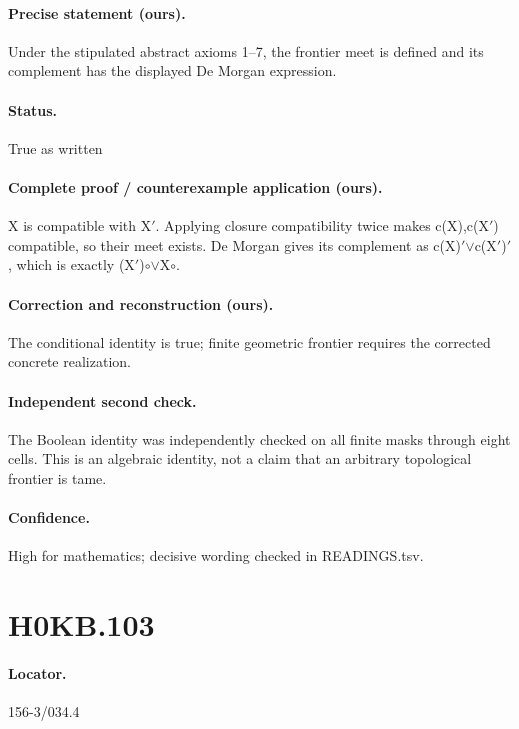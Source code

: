 \paragraph{Precise statement (ours).} Under the stipulated abstract axioms 1–7, the frontier meet is defined and its complement has the displayed De Morgan expression.

\paragraph{Status.} True as written

\paragraph{Complete proof / counterexample application (ours).} X is compatible with X\ensuremath{\prime}. Applying closure compatibility twice makes c(X),c(X\ensuremath{\prime}) compatible, so their meet exists. De Morgan gives its complement as c(X)\ensuremath{\prime}\ensuremath{\vee}c(X\ensuremath{\prime})\ensuremath{\prime}, which is exactly (X\ensuremath{\prime})\ensuremath{\circ}\ensuremath{\vee}X\ensuremath{\circ}.

\paragraph{Correction and reconstruction (ours).} The conditional identity is true; finite geometric frontier requires the corrected concrete realization.

\paragraph{Independent second check.} The Boolean identity was independently checked on all finite masks through eight cells. This is an algebraic identity, not a claim that an arbitrary topological frontier is tame.

\paragraph{Confidence.} High for mathematics; decisive wording checked in READINGS.tsv.

\section*{H0KB.103}\label{statement:H0KB.103}
\paragraph{Locator.} 156-3/034.4

